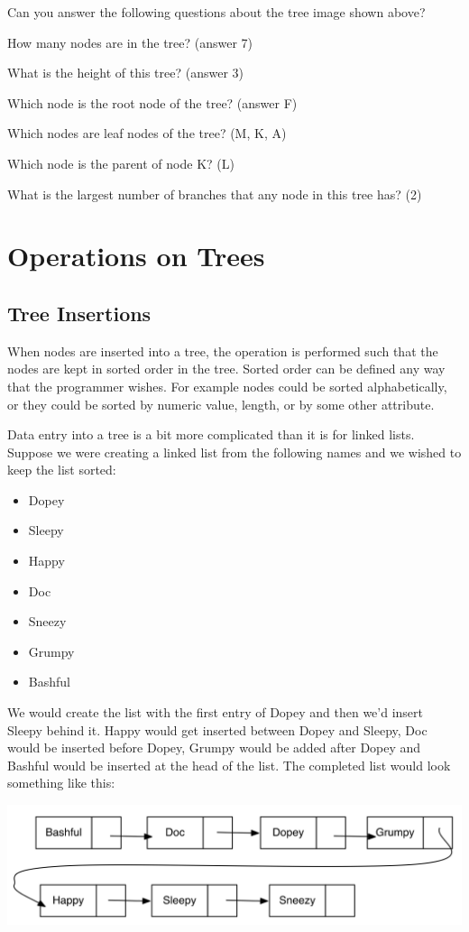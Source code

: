 Can you answer the following questions about the tree image shown above?  

  How many nodes are in the tree?  (answer 7)

  What is the height of this tree? (answer 3)

  Which node is the root node of the tree? (answer F)

  Which nodes are leaf nodes of the tree? (M, K, A)

  Which node is the parent of node K? (L)

  What is the largest number of branches that any node in this tree has? (2)


 \section {Operations on Trees} 
 \subsection{Tree Insertions}
  When nodes are inserted into a tree, the operation is performed such
  that the nodes are kept in sorted order in the tree. Sorted order can
  be defined any way that the programmer wishes. For example nodes could
  be sorted alphabetically, or they could be sorted by numeric value,
  length, or by some other attribute.
   
   Data entry into a tree is a bit more complicated than it is for linked
  lists. Suppose we were creating a linked list from the following names
  and we wished to keep the list sorted:
  
\begin{itemize}
\item Dopey
\item Sleepy
\item Happy
\item Doc
\item Sneezy
\item Grumpy
\item Bashful
\end{itemize}

We would create the list with the first entry of Dopey and then we'd
insert Sleepy behind it. Happy would get inserted between Dopey and
Sleepy, Doc would be inserted before Dopey, Grumpy would be added after
Dopey and Bashful would be inserted at the head of the list. The
completed list would look something like this:

\includegraphics{pictures/image3.png}

